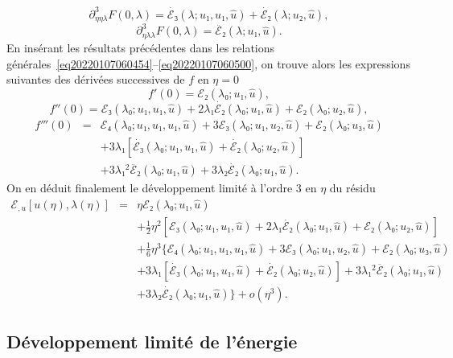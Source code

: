 \documentclass[12pt, final]{amsart}
\theoremstyle{definition}
\begin{document}
\begin{equation}
 \partial_{η η λ}^3 F(0, λ) =
 \dot{ℰ₃}(λ ; u₁, u₁, \hat{u}) + \dot{ℰ₂}
 (λ ; u₂, \hat{u}),
\end{equation}
\begin{equation}
 \partial_{η λ λ}^3 F(0, λ) =
 \ddot{ℰ₂}(λ ; u₁, \hat{u}) .
\end{equation}
En insérant les résultats précédentes dans les relations générales~\eqref{eq20220107060454}--\eqref{eq20220107060500}, on trouve alors les expressions suivantes des dérivées successives de \(f\) en \(η = 0\)
\begin{equation}
 f'(0) =ℰ₂(λ₀ ; u₁, \hat{u}),
\end{equation}
\begin{equation}
 f''(0) =ℰ₃(λ₀ ; u₁, u₁, \hat{u}) + 2 λ₁
 \dot{ℰ₂}(λ₀ ; u₁, \hat{u}) +ℰ₂(λ₀ ;
 u₂, \hat{u}),
\end{equation}
\begin{eqnarray}
 f'''(0) & = & ℰ₄(λ₀ ; u₁, u₁, u₁, \hat{u}) +
 3ℰ₃(λ₀ ; u₁, u₂, \hat{u}) +ℰ₂(λ₀ ;
 u₃, \hat{u}) \nonumber\\
 & & + 3 λ₁ [\dot{ℰ₃}(λ₀ ; u₁, u₁,
 \hat{u}) + \dot{ℰ₂}(λ₀ ; u₂, \hat{u})] \nonumber\\
 & & + 3 λ₁^2 \ddot{ℰ₂}(λ₀ ; u₁,
 \hat{u}) + 3 λ₂ \dot{ℰ₂}(λ₀ ; u₁, \hat{u}) .
\end{eqnarray}
On en déduit finalement le développement limité à l'ordre 3 en \(η\) du résidu
\begin{eqnarray}
 ℰ_{, u} [u(η), λ(η)] & = & η ℰ₂
 (λ₀ ; u₁, \hat{u}) \nonumber\\
 & & + \tfrac{1}{2} η^2 [ℰ₃(λ₀ ; u₁, u₁,
 \hat{u}) + 2 λ₁ \dot{ℰ₂}(λ₀ ; u₁, \hat{u})
 +ℰ₂(λ₀ ; u₂, \hat{u})] \nonumber\\
 & & + \tfrac{1}{6} η^3 \{ ℰ₄(λ₀ ; u₁,
 u₁, u₁, \hat{u}) + 3ℰ₃(λ₀ ; u₁, u₂, \hat{u})
  +ℰ₂(λ₀ ; u₃, \hat{u}) \nonumber\\
 & & + 3 λ₁ [\dot{ℰ₃}(λ₀ ; u₁, u₁,
 \hat{u}) + \dot{ℰ₂}(λ₀ ; u₂, \hat{u})] + 3 λ₁^2
 \ddot{ℰ₂}(λ₀ ; u₁, \hat{u}) \nonumber\\
 & &  + 3 λ₂ \dot{ℰ₂}(λ₀ ;
 u₁, \hat{u}) \} + o(η^3) . \label{eq20220107080901}
\end{eqnarray}
\subsection{Développement limité de l'énergie}\label{sec:DL
energie}
\end{document}
